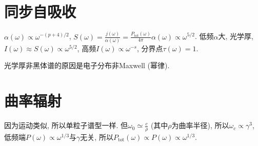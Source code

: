 \section{同步自吸收}

$\alpha(\omega)\propto\omega^{-(p+4)/2}$, $S(\omega)=\frac{j(\omega)}{\alpha(\omega)}=\frac{P_\text{tot}(\omega)}{4\pi}\alpha(\omega)\propto\omega^{5/2}$. 低频$\alpha$大, 光学厚, $I(\omega)\approx S(\omega)\propto\omega^{5/2}$, 高频$I(\omega)\propto\omega^{-s}$, 分界点$\tau(\omega)=1$.

光学厚非黑体谱的原因是电子分布非Maxwell (幂律).

\section{曲率辐射}

因为运动类似, 所以单粒子谱型一样. 但$\omega_0\simeq\frac{c}{\rho}$ (其中$\rho$为曲率半径), 所以$\omega_c\propto\gamma^3$, 低频端$P(\omega)\propto\omega^{1/3}$与$\gamma$无关, 所以$P_\text{tot}(\omega)\propto P(\omega)\propto\omega^{1/3}$.
